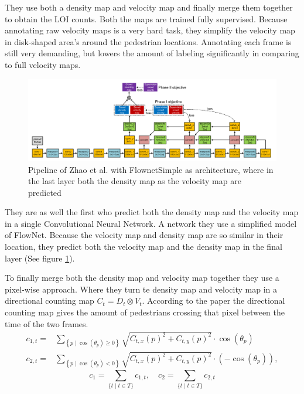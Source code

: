 They use both a density map and velocity map and finally merge them together to obtain the LOI counts. Both the maps are trained fully supervised. Because annotating raw velocity maps is a very hard task, they simplify the velocity map in disk-shaped area's around the pedestrian locations. Annotating each frame is still very demanding, but lowers the amount of labeling significantly in comparing to full velocity maps.

\begin{figure}[h]
\centering
\includegraphics[width=1.0\textwidth]{images/zhao16_model}
\caption{Pipeline of Zhao et al. with FlownetSimple as architecture, where in the last layer both the density map as the velocity map are predicted}
\label{fig:zhao_model}
\end{figure}


They are as well the first who predict both the density map and the velocity map in a single Convolutional Neural Network. A network they use a  simplified model of FlowNet. Because the velocity map and density map are so similar in their location, they predict both the velocity map and the density map in the final layer (See figure \ref{fig:zhao_model}).

To finally merge both the density map and velocity map together they use a pixel-wise approach. Where they turn te density map and velocity map in a directional counting map $C_t=D_t \otimes V_t$. According to the paper the directional counting map gives the amount of pedestrians crossing that pixel between the time of the two frames.
\begin{equation}
\begin{aligned}
c_{1, t} =& \sum_{\left\{p \mid \cos \left(\theta_{p}\right) \geq 0\right\}} \sqrt{C_{t, x}(p)^{2}+C_{t, y}(p)^{2}} \cdot \cos \left(\theta_{p}\right) \\
c_{2, t} =& \sum_{\left\{p \mid \cos \left(\theta_{p}\right)<0\right\}} \sqrt{C_{t, x}(p)^{2}+C_{t, y}(p)^{2}} \cdot\left(-\cos \left(\theta_{p}\right)\right),
\end{aligned}
\label{eq:zhao_sum_norm}
\end{equation}
\begin{equation}
c_{1}=\sum_{\{t \mid t \in T\}} c_{1, t}, \quad c_{2}=\sum_{\{t \mid t \in T\}} c_{2, t}
\label{eq:zhao_timeframe_sum}
\end{equation}

